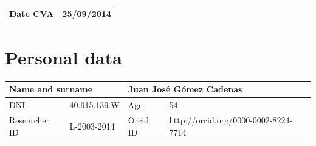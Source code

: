 \documentclass[a4paper,11pt,oneside]{article}
\begin{document}

%

\begin{table}[h!]
\begin{flushright}
\begin{tabular}{|l|c|}
\hline
Date CVA & 25/09/2014\\
\hline
\end{tabular}
\label{tab:DATE}
\end{flushright}
\end{table} 
\section{Personal data}

\begin{table}[h!]
\begin{center}
\begin{tabular}{| l | l | l | l |}
\hline
\multicolumn{2}{|l|}{Name and surname } & \multicolumn{2}{|l|}{ Juan José Gómez Cadenas}\\
\hline
DNI & 40.915.139.W & Age & 54 \\
\hline
Researcher ID &  L-2003-2014 &  Orcid ID &  http://orcid.org/0000-0002-8224-7714 \\
\hline
\end{tabular}
\label{tab:personal}
\end{center}
\end{table} 
\end{document}
